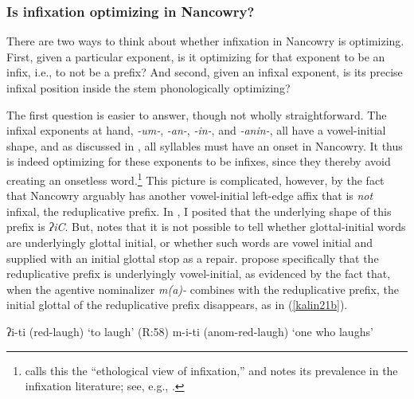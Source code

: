 \documentclass[output=paper]{langscibook}
\begin{document}
\subsubsection{Is infixation optimizing in Nancowry?}\label{kalinoptinf}\label{sec:kalin:4.3.2}

There are two ways to think about whether infixation in Nancowry is optimizing. First, given a particular exponent, is it optimizing for that exponent to be an infix, i.e., to not be a prefix? And second, given an infixal exponent, is its precise infixal position inside the stem phonologically optimizing?

The first question is easier to answer, though not wholly straightforward. The infixal exponents at hand, \textit{-um-}, \textit{-an-}, \textit{-in-}, and \textit{-anin-}, all have a vowel-initial shape, and as discussed in , all syllables must have an onset in Nancowry. It thus is indeed optimizing for these exponents to be infixes, since they thereby avoid creating an onsetless word.\footnote{\citet[\S2.5.1]{Yu07} calls this the ``ethological view of infixation,'' and notes its prevalence in the infixation literature; see, e.g., \citealt{Anderson72,Cohn92,Buckley97}.} This picture is complicated, however, by the fact that Nancowry arguably has another vowel-initial left-edge affix that is {\it not} infixal, the reduplicative prefix. In , I posited that the underlying shape of this prefix is \textit{ʔiC}. But, \citet[35]{Rad81} notes that it is not possible to tell whether glottal-initial words are underlyingly glottal initial, or whether such words are vowel initial and supplied with an initial glottal stop as a repair. \citet[348]{Alderete99} propose specifically that the reduplicative prefix is underlyingly vowel-initial, as evidenced by the fact that, when the agentive nominalizer \textit{m(a)-} combines with the reduplicative prefix, the initial glottal of the reduplicative prefix disappears, as in (\ref{kalin21b}).

\ea \ea ʔi-ti ({\sc red-}laugh) \hfill `to laugh' (R:58)
\ex m-i-ti ({\sc anom-red-}laugh) \hfill `one who laughs'\label{kalin21b}
\z
\z
\end{document}

